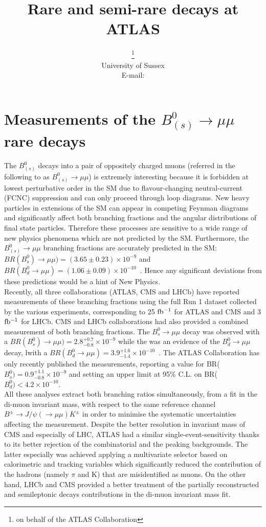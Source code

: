 \documentclass{PoS}
\title{Rare and semi-rare decays at ATLAS}
\author{\speaker{Umberto De Sanctis}\thanks{on behalf of the ATLAS Collaboration}\\
        University of Sussex\\
        E-mail: \email{umberto.de.sanctis@cern.ch}}
\begin{document}
\section{Measurements of the $B^0_{(s)} \to \mu\mu$ rare decays}
The $B^0_{(s)}$ decays into a pair of oppositely charged muons (referred in the following to as $B^0_{(s)} \to \mu\mu$) is extremely interesting because it is forbidden at lowest perturbative order in the SM due to flavour-changing neutral-current (FCNC) suppression and can only proceed through loop diagrams. New heavy particles in extensions of the SM can appear in competing Feynman diagrams and significantly affect both branching fractions and the angular distributions of final state particles. Therefore these processes are sensitive to a wide range of new physics phenomena which are not predicted by the SM. Furthermore, the $B^0_{(s)} \to \mu\mu$ branching fractions are accurately predicted in the SM: $BR(B^0_s) \to \mu\mu) = (3.65 \pm 0.23) \times 10^{-9}$ and $BR(B^0_d \to \mu\mu) = (1.06 \pm 0.09) \times 10^{-10}$~\cite{Bobeth}. Hence any significant deviations from these predictions would be a hint of New Physics.\\
Recently, all three collaborations (ATLAS,  CMS and LHCb) have reported measurements of these branching fractions using the full Run 1 dataset collected by the various experiments, corresponding to 25 $\rm{fb^{-1}}$ for ATLAS and CMS and 3 $\rm{fb^{-1}}$ for LHCb. CMS and LHCb collaborations had also provided a combined measurement of both branching fractions. The $B^0_s \to \mu\mu$ decay was observed with a $BR(B^0_s) \to \mu\mu) = 2.8^{+0.7}_{-0.8} \times 10^{-9}$ while the was an evidence of the  $B^0_d \to \mu\mu$ decay, lwith a  $BR(B^0_d \to \mu\mu) = 3.9^{+1.6}_{-1.4} \times 10^{-10}$~\cite{Nature}.
The ATLAS Collaboration has only recently published the measurements, reporting a value for BR($B^0_s) = 0.9^{+1.1}_{-0.8}\times 10^{-9}$ and setting an upper limit at 95\% C.L. on  BR($B^0_d) < 4.2 \times 10^{-10}$.~\cite{ATLAS}\\
All these analyses extract both branching ratios simultaneously, from a fit in the di-muon invariant mass, with respect to the same reference channel $B^{\pm} \to J/\psi(\to \mu \mu) K^{\pm}$ in order to minimise the systematic uncertainties affecting the measurement. Despite the better resolution in invariant mass of CMS and especially of LHC, ATLAS had a similar single-event-sensitivity thanks to its better rejection of the combinatorial and the peaking backgrounds. The latter especially was achieved applying a  multivariate selector based on calorimetric and tracking variables which significantly reduced the contribution of the hadrons (namely $\pi$ and K) that are misidentified as muons. On the other hand, LHCb and CMS provided a better treatment of the partially reconstructed and semileptonic decays contributions in the di-muon invariant mass fit.
\end{document}
